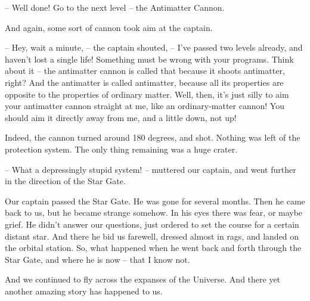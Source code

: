 \documentclass[ebook,twoside,final,openright]{memoir}
\begin{document}
– Well done! Go to the next level – the Antimatter Cannon.\par
And again, some sort of cannon took aim at the captain.\par
– Hey, wait a minute, – the captain shouted, – I’ve passed two levels already, and haven’t lost a single life! Something must be wrong with your programs. Think about it – the antimatter cannon is called that because it shoots antimatter, right? And the antimatter is called antimatter, because all its properties are opposite to the properties of ordinary matter. Well, then, it’s just silly to aim your antimatter cannon straight at me, like an ordinary-matter cannon! You should aim it directly away from me, and a little down, not up!\par
\par
Indeed, the cannon turned around 180 degrees, and shot. Nothing was left of the protection system. The only thing remaining was a huge crater.\par
– What a depressingly stupid system! – muttered our captain, and went further in the direction of the Star Gate.\par
\par
Our captain passed the Star Gate. He was gone for several months. Then he came back to us, but he became strange somehow. In his eyes there was fear, or maybe grief. He didn’t answer our questions, just ordered to set the course for a certain distant star. And there he bid us farewell, dressed almost in rags, and landed on the orbital station. So, what happened when he went back and forth through the Star Gate, and where he is now – that I know not. \par
\par
 And we continued to fly across the expanses of the Universe. And there yet another amazing story has happened to us.
\end{document}
